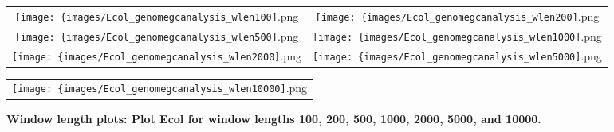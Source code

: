 % 
%
\begin{figure}[!h]

 \begin{center}
 
  \begin{tabular}{cc}
   \texttt{[image: \{images/Ecol\_genomegcanalysis\_wlen100]}.png}	&
   \texttt{[image: \{images/Ecol\_genomegcanalysis\_wlen200]}.png}	\\
   \texttt{[image: \{images/Ecol\_genomegcanalysis\_wlen500]}.png}	&
   \texttt{[image: \{images/Ecol\_genomegcanalysis\_wlen1000]}.png}	\\
   \texttt{[image: \{images/Ecol\_genomegcanalysis\_wlen2000]}.png}	&
   \texttt{[image: \{images/Ecol\_genomegcanalysis\_wlen5000]}.png}	\\
  \end{tabular}
  \begin{tabular}{c}
   \texttt{[image: \{images/Ecol\_genomegcanalysis\_wlen10000]}.png}	\\
  \end{tabular}
  \parbox{0.7\textwidth}{%
   \caption[Window length plots: Plot Ecol for window lengths 100, 200, 500, 1000, 2000, 5000, and 10000.]{%
   \label{fig:Ecol window length plots}\textbf{Window length plots: Plot Ecol for window lengths 100, 200, 500, 1000, 2000, 5000, and 10000.}
   }%
  }%

 \end{center}
 
\end{figure}



